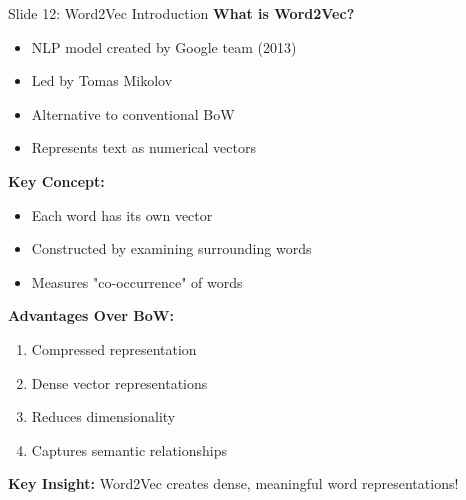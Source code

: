 \documentclass[8pt]{beamer}
\begin{document}
	\begin{frame}{Slide 12: Word2Vec Introduction}
		\fontsize{6.5}{7.5}\selectfont
		\textbf{What is Word2Vec?}
		\begin{itemize}
			\item NLP model created by Google team (2013)
			\item Led by Tomas Mikolov
			\item Alternative to conventional BoW
			\item Represents text as numerical vectors
		\end{itemize}
		
		\vspace{0.1cm}
		\textbf{Key Concept:}
		\begin{itemize}
			\item Each word has its own vector
			\item Constructed by examining surrounding words
			\item Measures "co-occurrence" of words
		\end{itemize}
		
		\vspace{0.1cm}
		\textbf{Advantages Over BoW:}
		\begin{enumerate}
			\item Compressed representation
			\item Dense vector representations
			\item Reduces dimensionality
			\item Captures semantic relationships
		\end{enumerate}
		
		\textcolor{myblue}{\textbf{Key Insight:}} Word2Vec creates dense, meaningful word representations!
	\end{frame}
	
\end{document}
